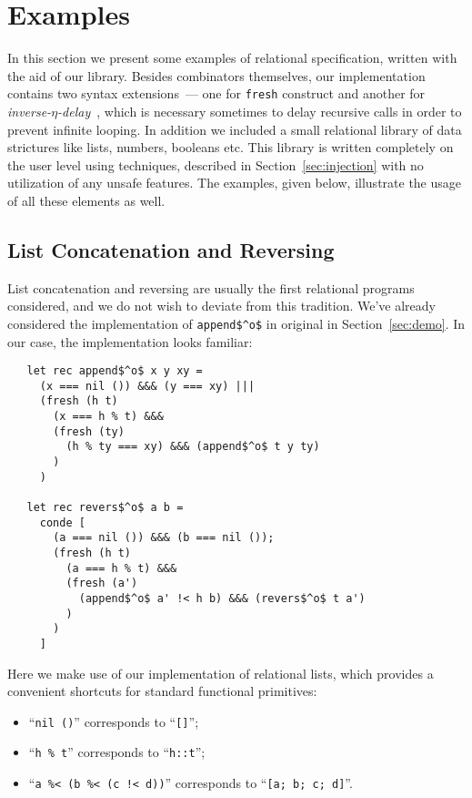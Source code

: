 \section{Examples}
\label{sec:examples}

In this section we present some examples of relational specification, written with the aid of our library. 
Besides \miniKanren combinators themselves, our implementation contains two syntax extensions~--- one
for \lstinline{fresh} construct and another for \emph{inverse-$\eta$-delay}~\cite{MicroKanren}, which is 
necessary sometimes to delay recursive calls in order to prevent infinite looping. In addition we included a 
small relational library of data strictures like lists, numbers, booleans etc. This library is written 
completely on the user level using techniques, described in Section~\ref{sec:injection} with no utilization 
of any unsafe features. The examples, given below, illustrate the usage of all these elements as well.

\subsection{List Concatenation and Reversing}

List concatenation and reversing are usually the first relational programs considered, and we do not wish
to deviate from this tradition. We've already considered the implementation of \lstinline{append$^o$} in
original \miniKanren in Section~\ref{sec:demo}. In our case, the implementation looks familiar:

\begin{lstlisting}
   let rec append$^o$ x y xy =
     (x === nil ()) &&& (y === xy) |||
     (fresh (h t)
       (x === h % t) &&&
       (fresh (ty)
         (h % ty === xy) &&& (append$^o$ t y ty) 
       )
     )

   let rec revers$^o$ a b =
     conde [
       (a === nil ()) &&& (b === nil ());
       (fresh (h t)
         (a === h % t) &&&
         (fresh (a')
           (append$^o$ a' !< h b) &&& (revers$^o$ t a')
         )
       )
     ]
\end{lstlisting}

Here we make use of our implementation of relational lists, which provides a convenient shortcuts for
standard functional primitives:

\begin{itemize}
  \item ``\lstinline{nil ()}'' corresponds to ``\lstinline{[]}'';
  \item ``\lstinline{h % t}'' corresponds to ``\lstinline{h::t}'';
  \item ``\lstinline{a %< (b %< (c !< d))}'' corresponds to ``\lstinline{[a; b; c; d]}''.
\end{itemize}

